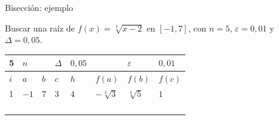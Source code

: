 \documentclass[main.tex]{subfiles}
\begin{document}
\begin{frame}[t]{Bisección: ejemplo}
\begin{minipage}[t][13mm][t]{\textwidth}\small Buscar una raíz de $f(x)=\sqrt[3]{x-2}$ en $[-1,7]$, con $n=5$, $\varepsilon=0{,}01$ y $\Delta=0{,}05$.\end{minipage}\par{\scriptsize\setlength{\tabcolsep}{2pt}\renewcommand{\arraystretch}{1}\begin{center}\begin{tabular}{|C{.04\textwidth}|C{.112\textwidth}|C{.112\textwidth}|C{.112\textwidth}|C{.112\textwidth}|C{.112\textwidth}|C{.112\textwidth}|C{.112\textwidth}|}
\hline
\rule{0pt}{4.3mm}5 & $n$ &  &  $\Delta$  & $0{,}05$ &  & $\varepsilon$ & $0{,}01$\\\hline
\rule{0pt}{4.3mm}$i$ & $a$ & $b$ & $c$ & $h$ & $f(a)$ & $f(b)$ & $f(c)$\\\hline
\rule{0pt}{4.3mm}1 & $-1$ & $7$ & $3$ & $4$ & $-\sqrt[3]3$ & $\sqrt[3]5$ & $1$\\\hline
\rule{0pt}{4.3mm} &  &  &  &  &  &  & \\\hline
\rule{0pt}{4.3mm} &  &  &  &  &  &  & \\\hline
\rule{0pt}{4.3mm} &  &  &  &  &  &  & \\\hline
\rule{0pt}{4.3mm} &  &  &  &  &  &  & \\\hline
\end{tabular}\end{center}}\begin{minipage}[t][10mm][t]{\textwidth}\footnotesize \end{minipage}
\end{frame}
\end{document}
